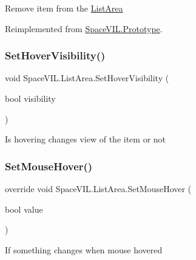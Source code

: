 Remove item from the \mbox{\hyperlink{class_space_v_i_l_1_1_list_area}{List\+Area}} 



Reimplemented from \mbox{\hyperlink{class_space_v_i_l_1_1_prototype_a7a2aabccfe6389f71d0265fa73f0ae87}{Space\+V\+I\+L.\+Prototype}}.

\mbox{\label{class_space_v_i_l_1_1_list_area_ab4a8ef41e41ece5524e49a0244f5fd21}} 
\subsubsection{\texorpdfstring{Set\+Hover\+Visibility()}{SetHoverVisibility()}}
{\footnotesize\ttfamily void Space\+V\+I\+L.\+List\+Area.\+Set\+Hover\+Visibility (\begin{DoxyParamCaption}\item[{bool}]{visibility }\end{DoxyParamCaption})}



Is hovering changes view of the item or not 

\mbox{\label{class_space_v_i_l_1_1_list_area_a14f2764a6ad13641bf4761f37a5ec2ae}} 
\subsubsection{\texorpdfstring{Set\+Mouse\+Hover()}{SetMouseHover()}}
{\footnotesize\ttfamily override void Space\+V\+I\+L.\+List\+Area.\+Set\+Mouse\+Hover (\begin{DoxyParamCaption}\item[{bool}]{value }\end{DoxyParamCaption})\hspace{0.3cm}{\ttfamily [virtual]}}



If something changes when mouse hovered 



